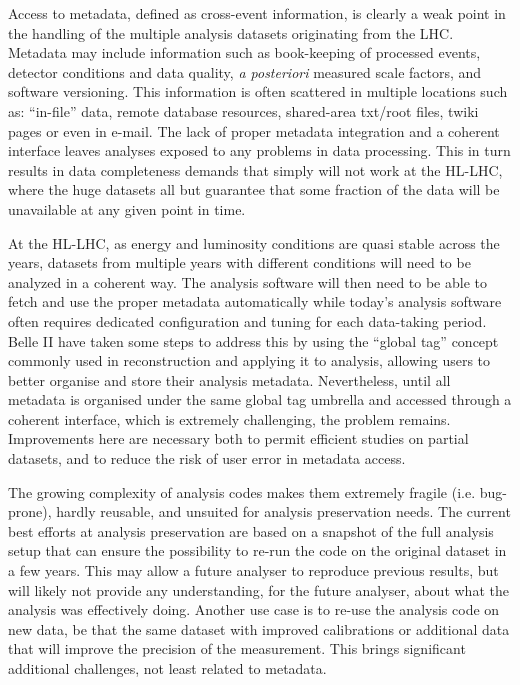 \documentclass[10pt,a4paper]{article}
\begin{document}
Access to metadata, defined as cross-event information, is clearly a
weak point in the handling of the multiple analysis datasets originating
from the LHC. Metadata may include information such as book-keeping of
processed events, detector conditions and data quality, \emph{a
posteriori} measured scale factors, and software versioning. This
information is often scattered in multiple locations such as:
``in-file'' data, remote database resources, shared-area txt/root files,
twiki pages or even in e-mail. The lack of proper metadata integration
and a coherent interface leaves analyses exposed to any problems in data
processing. This in turn results in data completeness demands that
simply will not work at the HL-LHC, where the huge datasets all but
guarantee that some fraction of the data will be unavailable at any
given point in time.

At the HL-LHC, as energy and luminosity conditions are quasi stable
across the years, datasets from multiple years with different conditions
will need to be analyzed in a coherent way. The analysis software will
then need to be able to fetch and use the proper metadata automatically
while today's analysis software often requires dedicated configuration
and tuning for each data-taking period. Belle II have taken some steps
to address this by using the ``global tag'' concept commonly used in
reconstruction and applying it to analysis, allowing users to better
organise and store their analysis metadata. Nevertheless, until all
metadata is organised under the same global tag umbrella and accessed
through a coherent interface, which is extremely challenging, the
problem remains. Improvements here are necessary both to permit
efficient studies on partial datasets, and to reduce the risk of user
error in metadata access.

The growing complexity of analysis codes makes them extremely fragile
(i.e. bug-prone), hardly reusable, and unsuited for analysis
preservation needs. The current best efforts at analysis preservation
are based on a snapshot of the full analysis setup that can ensure the
possibility to re-run the code on the original dataset in a few years.
This may allow a future analyser to reproduce previous results, but will
likely not provide any understanding, for the future analyser, about
what the analysis was effectively doing. Another use case is to re-use
the analysis code on new data, be that the same dataset with improved
calibrations or additional data that will improve the precision of the
measurement. This brings significant additional challenges, not least
related to metadata.
\end{document}
